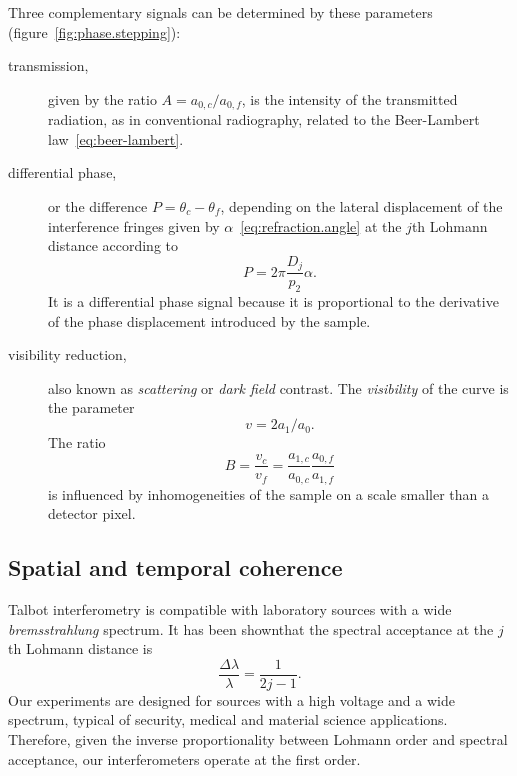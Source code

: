 Three complementary signals can be determined by these parameters
(figure~\ref{fig:phase.stepping}):
\begin{description}
    \item[transmission,] given by the ratio $A = a_{0,c} / a_{0,f}$, is the
        intensity of the transmitted radiation, as in conventional
        radiography, related to the Beer-Lambert
        law~\eqref{eq:beer-lambert}.
    \item[differential phase,] or the difference $P = \theta_{c} -
        \theta_f$, depending on the lateral displacement of the interference
        fringes given by
        $\alpha$~\eqref{eq:refraction.angle} at the
        $j$th Lohmann distance according to
        \begin{equation}
            P = 2\pi \frac{D_j}{p_2}\alpha.\label{eq:differential.phase}
        \end{equation}
        It is a differential phase signal because it is proportional to the
        derivative of the phase displacement introduced by the sample.
    \item[visibility reduction,] also known as 
        \emph{scattering} or \emph{dark field} contrast. The
        \emph{visibility} of the curve is the parameter
        \begin{equation}
            v = 2a_1 / a_0.
            \label{eq:visibility-definition}
        \end{equation}
        The ratio
        \begin{equation}
            B = \frac{v_c}{v_f} =
            \frac{a_{1,c}}{a_{0,c}}\frac{a_{0,f}}{a_{1,f}}
            \label{eq:dark-field-definition}
        \end{equation}
        is influenced by inhomogeneities of the sample on a scale smaller
        than a detector pixel\cn.
\end{description}

\subsection{Spatial and temporal coherence}\label{sec:coherence}
Talbot interferometry is compatible with laboratory sources with a wide
\emph{bremsstrahlung} spectrum. It has been shown\cn that the spectral
acceptance at the $j$th Lohmann distance is
\begin{equation}
    \frac{\Delta \lambda}{\lambda} = \frac{1}{2j - 1}.\label{eq:acceptance}
\end{equation}
Our experiments are designed for sources with a high voltage and a wide
spectrum, typical of security, medical and material science applications.
Therefore, given the inverse proportionality between Lohmann order
and spectral acceptance, our interferometers operate at the first order.

